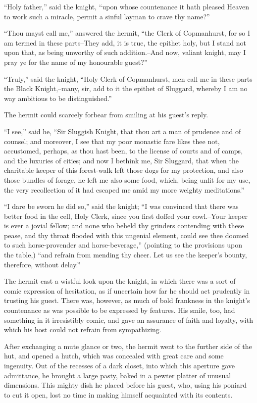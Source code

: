 ``Holy father,'' said the knight, ``upon whose countenance it hath
pleased Heaven to work such a miracle, permit a sinful layman to crave
thy name?''

``Thou mayst call me,'' answered the hermit, ``the Clerk of Copmanhurst,
for so I am termed in these parts--They add, it is true, the epithet
holy, but I stand not upon that, as being unworthy of such
addition.--And now, valiant knight, may I pray ye for the name of my
honourable guest?''

``Truly,'' said the knight, ``Holy Clerk of Copmanhurst, men call me in
these parts the Black Knight,--many, sir, add to it the epithet of
Sluggard, whereby I am no way ambitious to be distinguished.''

The hermit could scarcely forbear from smiling at his guest's reply.

``I see,'' said he, ``Sir Sluggish Knight, that thou art a man of
prudence and of counsel; and moreover, I see that my poor monastic fare
likes thee not, accustomed, perhaps, as thou hast been, to the license
of courts and of camps, and the luxuries of cities; and now I bethink
me, Sir Sluggard, that when the charitable keeper of this forest-walk
left those dogs for my protection, and also those bundles of forage, he
left me also some food, which, being unfit for my use, the very
recollection of it had escaped me amid my more weighty meditations.''

``I dare be sworn he did so,'' said the knight; ``I was convinced that
there was better food in the cell, Holy Clerk, since you first doffed
your cowl.--Your keeper is ever a jovial fellow; and none who beheld thy
grinders contending with these pease, and thy throat flooded with this
ungenial element, could see thee doomed to such horse-provender and
horse-beverage,'' (pointing to the provisions upon the table,) ``and
refrain from mending thy cheer. Let us see the keeper's bounty,
therefore, without delay.''

The hermit cast a wistful look upon the knight, in which there was a
sort of comic expression of hesitation, as if uncertain how far he
should act prudently in trusting his guest. There was, however, as much
of bold frankness in the knight's countenance as was possible to be
expressed by features. His smile, too, had something in it irresistibly
comic, and gave an assurance of faith and loyalty, with which his host
could not refrain from sympathizing.

After exchanging a mute glance or two, the hermit went to the further
side of the hut, and opened a hutch, which was concealed with great care
and some ingenuity. Out of the recesses of a dark closet, into which
this aperture gave admittance, he brought a large pasty, baked in a
pewter platter of unusual dimensions. This mighty dish he placed before
his guest, who, using his poniard to cut it open, lost no time in making
himself acquainted with its contents.

